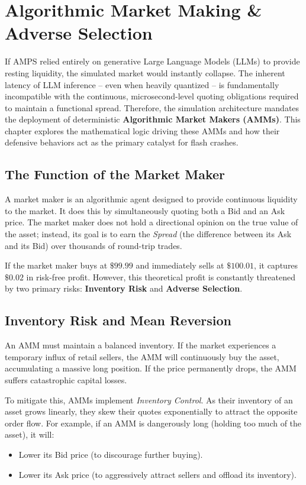 \chapter{Algorithmic Market Making \& Adverse Selection}
\label{ch:algorithmic_market_making}

If AMPS relied entirely on generative Large Language Models (LLMs) to provide resting liquidity, the simulated market would instantly collapse. The inherent latency of LLM inference -- even when heavily quantized -- is fundamentally incompatible with the continuous, microsecond-level quoting obligations required to maintain a functional spread. Therefore, the simulation architecture mandates the deployment of deterministic \textbf{Algorithmic Market Makers (AMMs)}. This chapter explores the mathematical logic driving these AMMs and how their defensive behaviors act as the primary catalyst for flash crashes.

\section{The Function of the Market Maker}

A market maker is an algorithmic agent designed to provide continuous liquidity to the market. It does this by simultaneously quoting both a Bid and an Ask price. The market maker does not hold a directional opinion on the true value of the asset; instead, its goal is to earn the \textit{Spread} (the difference between its Ask and its Bid) over thousands of round-trip trades.

If the market maker buys at $\$99.99$ and immediately sells at $\$100.01$, it captures $\$0.02$ in risk-free profit. However, this theoretical profit is constantly threatened by two primary risks: \textbf{Inventory Risk} and \textbf{Adverse Selection}.

\section{Inventory Risk and Mean Reversion}

An AMM must maintain a balanced inventory. If the market experiences a temporary influx of retail sellers, the AMM will continuously buy the asset, accumulating a massive long position. If the price permanently drops, the AMM suffers catastrophic capital losses.

To mitigate this, AMMs implement \textit{Inventory Control}. As their inventory of an asset grows linearly, they skew their quotes exponentially to attract the opposite order flow. 
For example, if an AMM is dangerously long (holding too much of the asset), it will:
\begin{itemize}
    \item Lower its Bid price (to discourage further buying).
    \item Lower its Ask price (to aggressively attract sellers and offload its inventory).
\end{itemize}

